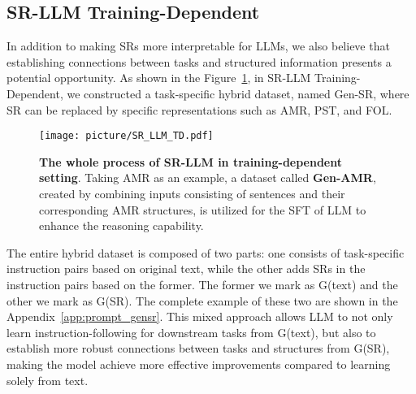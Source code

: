 
\subsection{SR-LLM Training-Dependent}

In addition to making SRs more interpretable for LLMs, we also believe that establishing connections between tasks and structured information presents a potential opportunity. As shown in the Figure~\ref{fig:srllmtd}, in SR-LLM Training-Dependent, we constructed a task-specific hybrid dataset, named Gen-SR, where SR can be replaced by specific representations such as AMR, PST, and FOL. 

\begin{figure}
\centering
\vspace{0in}
\texttt{[image: picture/SR\_LLM\_TD.pdf]}
\caption{\textbf{The whole process of SR-LLM in training-dependent setting}. Taking AMR as an example, a dataset called \textbf{Gen-AMR}, created by combining inputs consisting of sentences and their corresponding AMR structures, is utilized for the SFT of LLM to enhance the reasoning capability.}
\label{fig:srllmtd}
\vspace{-0.1in}
\end{figure}

The entire hybrid dataset is composed of two parts: one consists of task-specific instruction pairs based on original text, while the other adds SRs in the instruction pairs based on the former. The former we mark as G(text) and the other we mark as G(SR). The complete example of these two are shown in the Appendix~\ref{app:prompt_gensr}. This mixed approach allows LLM to not only learn instruction-following for downstream tasks from G(text), but also to establish more robust connections between tasks and structures from G(SR), making the model achieve more effective improvements compared to learning solely from text.


